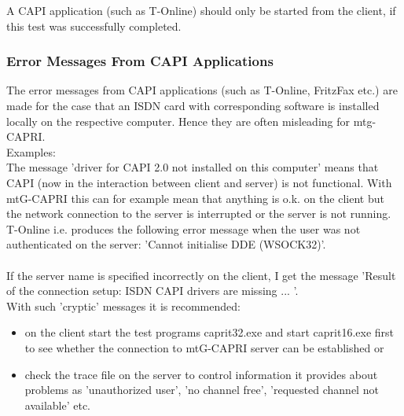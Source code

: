     A CAPI application (such as T-Online) should only be started from the client, if this
    test was successfully completed.

\subsubsection{Error Messages From CAPI Applications}
    The error messages from CAPI applications (such as T-Online, FritzFax etc.) are made for the case
    that an ISDN card with corresponding software is installed locally on the respective computer.
    Hence they are often misleading for mtg-CAPRI.\\
    Examples: \\

    The message 'driver for CAPI 2.0 not installed on this computer' means that
    CAPI (now in the interaction between client and server) is not functional.
    With mtG-CAPRI this can for example mean that anything is o.k. on the client but
    the network connection to the server is interrupted or the server is not running. \\
    T-Online i.e. produces the following error message when the user was not authenticated on the server:
    'Cannot initialise DDE (WSOCK32)'. \\
    \\
    If the server name is specified incorrectly on the client, I get the message 'Result of the connection setup:
    ISDN CAPI drivers are missing ... '. \\
    With such 'cryptic' messages it is recommended:
    \begin{itemize}
        \item on the client start the test programs caprit32.exe and start caprit16.exe first
         to see whether the connection to mtG-CAPRI server can be established or
        \item check the trace file on the server to control information it provides about problems
         as 'unauthorized user', 'no channel free', 'requested channel not available' etc.
    \end{itemize}

